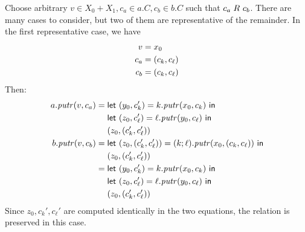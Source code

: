 \begin{defn}[$R$-similarity]
\begin{theorem}
\begin{lemma}
\begin{theorem}[No products]
\begin{lemma}
\begin{functoriality}
Choose arbitrary $v \in X_0+X_1,c_a \in a.C,c_b \in b.C$ such that $c_a
\mathrel{R_{}} c_b$. There are many cases to consider, but two of them are
representative of the remainder. In the first representative case, we have
\begin{align*}
    v &=  x_0 \\
    c_a &= ( c_k,  c_\ell) \\
    c_b &=  (c_k,c_\ell)
\end{align*}
Then:
\begin{align*}
    a.\mathit{putr}(v,c_a) ={}
    & \mathsf{let}\  (y_0,c_k') = k.\mathit{putr}(x_0,c_k) \ \mathsf{in} \\
    & \mathsf{let}\  (z_0,c_\ell') = \ell.\mathit{putr}(y_0,c_\ell) \ \mathsf{in} \\
    & ( z_0,( c_k', c_\ell')) \\
    b.\mathit{putr}(v,c_b) ={}
    & \mathsf{let}\  (z_0,(c_k',c_\ell')) = (k;\ell).\mathit{putr}(x_0,(c_k,c_\ell)) \ \mathsf{in} \\
    & ( z_0, (c_k',c_\ell')) \\
    ={}
    & \mathsf{let}\  (y_0,c_k') = k.\mathit{putr}(x_0,c_k) \ \mathsf{in} \\
    & \mathsf{let}\  (z_0,c_\ell') = \ell.\mathit{putr}(y_0,c_\ell) \ \mathsf{in} \\
    & ( z_0, (c_k',c_\ell'))
\end{align*}
Since $z_0,c_k',c_\ell'$ are computed identically in the two equations, the
relation is preserved in this case.


\end{functoriality}
\end{lemma}
\end{theorem}
\end{lemma}
\end{theorem}
\end{defn}

